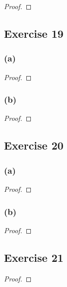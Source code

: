 \documentclass[14pt]{extarticle}
\begin{document}
\begin{proof}

\end{proof}

\subsection{Exercise 19}

\subsubsection{(a)}

\begin{proof}

\end{proof}

\subsubsection{(b)}

\begin{proof}

\end{proof}

\subsection{Exercise 20}

\subsubsection{(a)}

\begin{proof}

\end{proof}

\subsubsection{(b)}

\begin{proof}

\end{proof}

\subsection{Exercise 21}

\begin{proof}

\end{proof}
\end{document}
